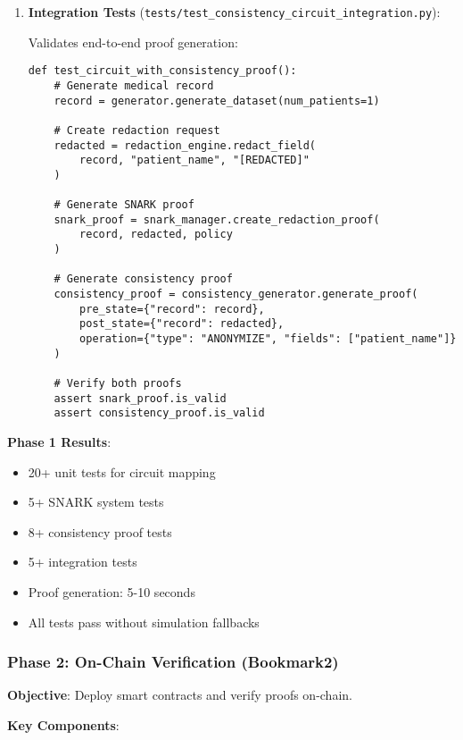 \begin{enumerate}
    \item \textbf{Integration Tests} (\texttt{tests/test\_consistency\_circuit\_integration.py}):
    
    Validates end-to-end proof generation:
    
    \begin{verbatim}
def test_circuit_with_consistency_proof():
    # Generate medical record
    record = generator.generate_dataset(num_patients=1)
    
    # Create redaction request
    redacted = redaction_engine.redact_field(
        record, "patient_name", "[REDACTED]"
    )
    
    # Generate SNARK proof
    snark_proof = snark_manager.create_redaction_proof(
        record, redacted, policy
    )
    
    # Generate consistency proof
    consistency_proof = consistency_generator.generate_proof(
        pre_state={"record": record},
        post_state={"record": redacted},
        operation={"type": "ANONYMIZE", "fields": ["patient_name"]}
    )
    
    # Verify both proofs
    assert snark_proof.is_valid
    assert consistency_proof.is_valid
\end{verbatim}
\end{enumerate}

\textbf{Phase 1 Results}:
\begin{itemize}
    \item 20+ unit tests for circuit mapping
    \item 5+ SNARK system tests
    \item 8+ consistency proof tests
    \item 5+ integration tests
    \item Proof generation: 5-10 seconds
    \item All tests pass without simulation fallbacks
\end{itemize}

\subsubsection{Phase 2: On-Chain Verification (Bookmark2)}

\textbf{Objective}: Deploy smart contracts and verify proofs on-chain.

\textbf{Key Components}:

